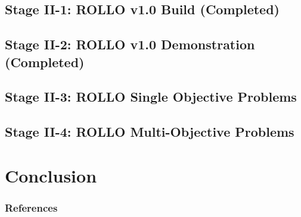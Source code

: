 \documentclass[9pt]{beamer}
\begin{document}
\subsection{Stage II-1: ROLLO v1.0 Build (Completed)}

\subsection{Stage II-2: ROLLO v1.0 Demonstration (Completed)}

\subsection{Stage II-3: ROLLO Single Objective Problems}

\subsection{Stage II-4: ROLLO Multi-Objective Problems}


\section{Conclusion}


%
\begin{frame}[allowframebreaks]
  \frametitle{References}
  
  {\footnotesize  }

\end{frame}

\end{document}
